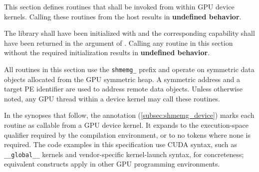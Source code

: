
This section defines routines that shall be invoked from within \ac{GPU} device
kernels. Calling these routines from the host results in \textbf{undefined
behavior}.

The \openshmem library shall have been initialized with
 and the corresponding capability shall have
been returned in the  argument of .
Calling any routine in this section without the required initialization results
in \textbf{undefined behavior}.

All routines in this section use the \texttt{shmemg\_} prefix and operate on
symmetric data objects allocated from the \ac{GPU} symmetric heap. A symmetric
address and a target \ac{PE} identifier are used to address remote data objects.
Unless otherwise noted, any \ac{GPU} thread within a device kernel may call these
routines.

In the synopses that follow, the  annotation
(\cref{subsec:shmemg_device}) marks each routine as callable from a \ac{GPU}
device kernel. It expands to the execution-space qualifier required by the
compilation environment, or to no tokens where none is required. The code
examples in this specification use CUDA syntax, such as \texttt{\_\_global\_\_}
kernels and vendor-specific kernel-launch syntax, for concreteness; equivalent
constructs apply in other \ac{GPU} programming environments.

